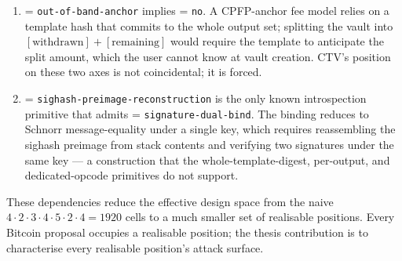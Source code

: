 \begin{enumerate}
\item \axfee{} = \texttt{out-of-band-anchor} implies \axrevault{} =
  \texttt{no}. A CPFP-anchor fee model relies on a template hash
  that commits to the whole output set; splitting the vault into
  $[\text{withdrawn}] + [\text{remaining}]$ would require the
  template to anticipate the split amount, which the user cannot
  know at vault creation. CTV's position on these two axes is not
  coincidental; it is forced.

\item \axintro{} = \texttt{sighash-preimage-reconstruction} is the
  only known introspection primitive that admits \axwdbind{} =
  \texttt{signature-dual-bind}. The binding reduces to Schnorr
  message-equality under a single key, which requires reassembling
  the sighash preimage from stack contents and verifying two
  signatures under the same key --- a construction that the
  whole-template-digest, per-output, and dedicated-opcode primitives
  do not support.
\end{enumerate}

These dependencies reduce the effective design space from the naive
$4 \cdot 2 \cdot 3 \cdot 4 \cdot 5 \cdot 2 \cdot 4 = 1920$ cells to
a much smaller set of realisable positions. Every Bitcoin
proposal occupies a realisable position; the thesis contribution is
to characterise every realisable position's attack surface.
